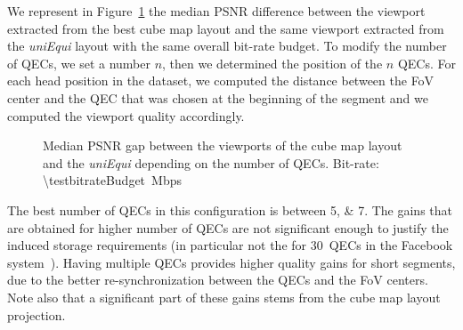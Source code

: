 We represent in Figure~\ref{fig:QEC} the median \ac{PSNR} difference
between the viewport extracted from the best cube map layout and the
same viewport extracted from the \emph{uniEqui} layout with the same
overall bit-rate budget. To modify the number of \acp{QEC}, we set a
number $n$, then we determined the position of the $n$ \acp{QEC}.
For each head position in the dataset, we computed the distance
between the \ac{FoV} center and the \ac{QEC} that was chosen at the
beginning of the segment and we computed the viewport quality
accordingly.
%
%


\begin{figure}
\centering

\caption{Median \acs{PSNR} gap between the viewports of the cube map layout and the \textit{uniEqui} depending
on the number of QECs.
Bit-rate: \SI{\testbitrateBudget}{\mega bps}}
\label{fig:QEC}
\end{figure}

The best number of \acp{QEC} in this configuration is between
\numlist{5;7}. The gains that are obtained for higher number of
\acp{QEC} are not significant enough to justify the induced storage
requirements (in particular not the for $30$~\acp{QEC} in the Facebook
system~\cite{facebook}). Having multiple  \acp{QEC} provides higher
quality gains for short segments, due to the better re-synchronization
between the \acp{QEC} and the \ac{FoV} centers. Note also that a
significant part of these gains stems from the cube map layout
projection.
%
